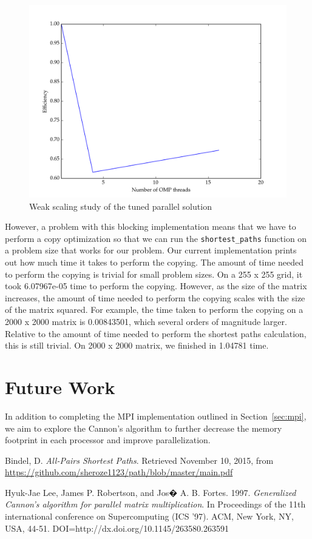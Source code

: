 \documentclass[11pt]{article}
\begin{document}
\begin{figure}[H]
\centering
\includegraphics[scale=0.5]{./scaling_studies/weak_scaling_eric.png}
\caption{Weak scaling study of the tuned parallel solution}
\label{fig:ws_eric}
\end{figure}

However, a problem with this blocking implementation means that we have to perform a copy optimization so that we can run the \texttt{shortest\_paths} function on a problem size that works for our problem. Our current implementation prints out how much time it takes to perform the copying. The amount of time needed to perform the copying is trivial for small problem sizes. On a 255 x 255 grid, it took 6.07967e-05 time to perform the copying. However, as the size of the matrix increases, the amount of time needed to perform the copying scales with the size of the matrix squared. For example, the time taken to perform the copying on a 2000 x 2000 matrix is 0.00843501, which several orders of magnitude larger. Relative to the amount of time needed to perform the shortest paths calculation, this is still trivial. On 2000 x 2000 matrix, we finished in 1.04781 time.

\section{Future Work}

In addition to completing the MPI implementation outlined in Section~\ref{sec:mpi}, we aim to explore the Cannon's algorithm \cite{cannon} to further decrease the memory footprint in each processor and improve parallelization. 

\begin{thebibliography}{9}
Bindel, D. \textit{All-Pairs Shortest Paths}. Retrieved November 10, 2015, from \url{https://github.com/sheroze1123/path/blob/master/main.pdf}

Hyuk-Jae Lee, James P. Robertson, and Jos� A. B. Fortes. 1997. \textit{Generalized Cannon's algorithm for parallel matrix multiplication}. In Proceedings of the 11th international conference on Supercomputing (ICS '97). ACM, New York, NY, USA, 44-51. DOI=http://dx.doi.org/10.1145/263580.263591

\end{thebibliography}

 
 
\end{document}
